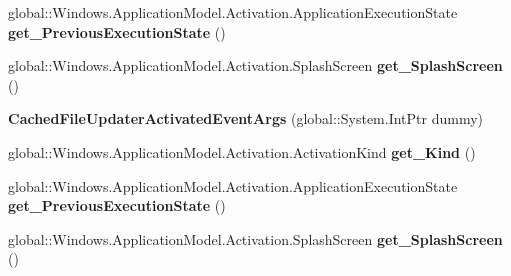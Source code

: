 \begin{DoxyCompactItemize}
global\+::\+Windows.\+Application\+Model.\+Activation.\+Application\+Execution\+State {\bfseries get\+\_\+\+Previous\+Execution\+State} ()
\item 
\mbox{\label{class_windows_1_1_application_model_1_1_activation_1_1_cached_file_updater_activated_event_args_a319cfb525fe9fa17cf926258148c647f}} 
global\+::\+Windows.\+Application\+Model.\+Activation.\+Splash\+Screen {\bfseries get\+\_\+\+Splash\+Screen} ()
\item 
\mbox{\label{class_windows_1_1_application_model_1_1_activation_1_1_cached_file_updater_activated_event_args_a844d82c24a31bc04836b059ef6b16a43}} 
{\bfseries Cached\+File\+Updater\+Activated\+Event\+Args} (global\+::\+System.\+Int\+Ptr dummy)
\item 
\mbox{\label{class_windows_1_1_application_model_1_1_activation_1_1_cached_file_updater_activated_event_args_a75fb8e465e54de63f9f00e2161f7b4f8}} 
global\+::\+Windows.\+Application\+Model.\+Activation.\+Activation\+Kind {\bfseries get\+\_\+\+Kind} ()
\item 
\mbox{\label{class_windows_1_1_application_model_1_1_activation_1_1_cached_file_updater_activated_event_args_a80869a1d23ec97fe09edcef4a57bbec8}} 
global\+::\+Windows.\+Application\+Model.\+Activation.\+Application\+Execution\+State {\bfseries get\+\_\+\+Previous\+Execution\+State} ()
\item 
\mbox{\label{class_windows_1_1_application_model_1_1_activation_1_1_cached_file_updater_activated_event_args_a319cfb525fe9fa17cf926258148c647f}} 
global\+::\+Windows.\+Application\+Model.\+Activation.\+Splash\+Screen {\bfseries get\+\_\+\+Splash\+Screen} ()
\item 
\mbox{\label{class_windows_1_1_application_model_1_1_activation_1_1_cached_file_updater_activated_event_args_a844d82c24a31bc04836b059ef6b16a43}} 

\end{DoxyCompactItemize}
